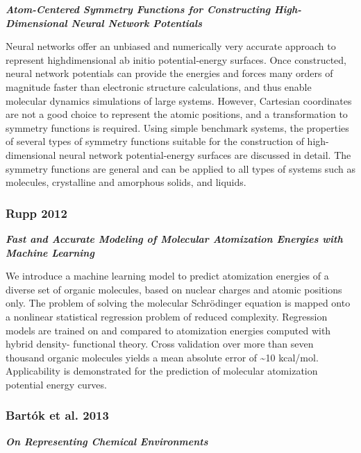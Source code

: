 \documentclass[11pt]{article}
\begin{document}
\textbf{\emph{Atom-Centered Symmetry Functions for Constructing
High-Dimensional Neural Network Potentials}}

Neural networks offer an unbiased and numerically very accurate approach
to represent highdimensional ab initio potential-energy surfaces. Once
constructed, neural network potentials can provide the energies and
forces many orders of magnitude faster than electronic structure
calculations, and thus enable molecular dynamics simulations of large
systems. However, Cartesian coordinates are not a good choice to
represent the atomic positions, and a transformation to symmetry
functions is required. Using simple benchmark systems, the properties of
several types of symmetry functions suitable for the construction of
high-dimensional neural network potential-energy surfaces are discussed
in detail. The symmetry functions are general and can be applied to all
types of systems such as molecules, crystalline and amorphous solids,
and liquids.

    \subsubsection{Rupp 2012}\label{rupp-2012}

\textbf{\emph{Fast and Accurate Modeling of Molecular Atomization
Energies with Machine Learning}}

We introduce a machine learning model to predict atomization energies of
a diverse set of organic molecules, based on nuclear charges and atomic
positions only. The problem of solving the molecular Schrödinger
equation is mapped onto a nonlinear statistical regression problem of
reduced complexity. Regression models are trained on and compared to
atomization energies computed with hybrid density- functional theory.
Cross validation over more than seven thousand organic molecules yields
a mean absolute error of \textasciitilde{}10 kcal/mol. Applicability is
demonstrated for the prediction of molecular atomization potential
energy curves.

    \subsubsection{Bartók et al. 2013}\label{bartuxf3k-et-al.-2013}

\textbf{\emph{On Representing Chemical Environments}}
\end{document}
